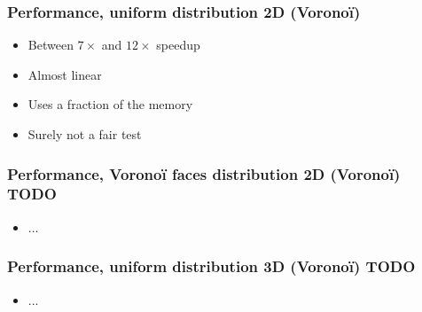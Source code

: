 \documentclass[aspectratio=169]{beamer}
\begin{document}
\begin{frame}
    \frametitle{Performance, uniform distribution 2D (Voronoï)}

    \begin{minipage}[c][0.6\textheight][c]{0.55\textwidth}
        
    \end{minipage}
    \begin{minipage}[c][0.6\textheight][c]{0.4\textwidth}
        \begin{itemize}
            \item Between $7\times$ and $12\times$ speedup

            \bigskip
            \item Almost linear

            \bigskip
            \item Uses a fraction of the memory

            \vfill
            \item Surely not a fair test
        \end{itemize}
    \end{minipage}
\end{frame}


\begin{frame}
    \frametitle{Performance, Voronoï faces distribution 2D (Voronoï)    TODO}

    \begin{minipage}[c][0.6\textheight][c]{0.55\textwidth}
        
    \end{minipage}
    \begin{minipage}[c][0.6\textheight][c]{0.4\textwidth}
        \begin{itemize}
            \item ...
        \end{itemize}
    \end{minipage}
\end{frame}

\begin{frame}
    \frametitle{Performance, uniform distribution 3D (Voronoï)    TODO}

    \begin{minipage}[c][0.6\textheight][c]{0.55\textwidth}
        
    \end{minipage}
    \begin{minipage}[c][0.6\textheight][c]{0.4\textwidth}
        \begin{itemize}
            \item ...
        \end{itemize}
    \end{minipage}
\end{frame}
\end{document}
